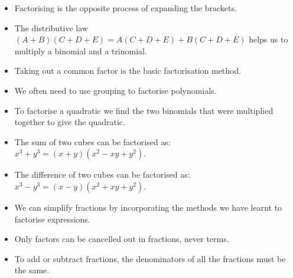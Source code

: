 \begin{itemize}[itemsep=5pt, label=\textbullet{}]
\item Factorising is the opposite process of expanding the brackets.
\item The distributive law $\left(A+B\right)\left(C+D+E\right)=A\left(C+D+E\right)+B\left(C+D+E\right)$ helps us to multiply a binomial and a trinomial.
\item Taking out a common factor is the basic factorisation method.
\item We often need to use grouping to factorise polynomials.
\item To factorise a quadratic we find the two binomials that were multiplied together to give the quadratic.
\item The sum of two cubes can be factorised as: ${x}^{3}+{y}^{3}=\left(x+y\right)\left({x}^{2}-xy+{y}^{2}\right)$. 
\item The difference of two cubes can be factorised as: ${x}^{3}-{y}^{3}=\left(x-y\right)\left({x}^{2}+xy+{y}^{2}\right)$.
\item We can simplify fractions by incorporating the methods we have learnt to factorise expressions.
\item Only factors can be cancelled out in fractions, never terms.
\item To add or subtract fractions, the denominators of all the fractions must be the same.

\end{itemize}


